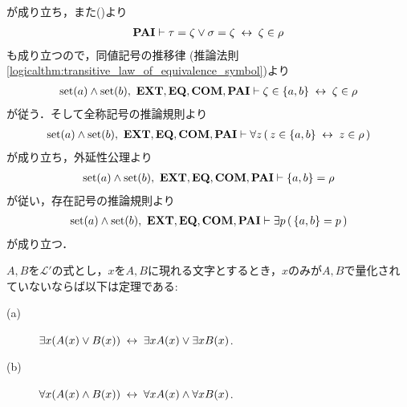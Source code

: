 \begin{sketch}
\begin{description}
				が成り立ち，また()より
				\begin{align}
					\mbox{{\bf PAI}} \vdash \tau = \zeta \vee \sigma = \zeta \hspace{0.25em}\leftrightarrow\hspace{0.25em} \zeta \in \rho
				\end{align}
				も成り立つので，同値記号の推移律
				(推論法則\ref{logicalthm:transitive_law_of_equivalence_symbol})より
				\begin{align}
					\operatorname*{set} (a) \wedge \operatorname*{set} (b),\ \mbox{{\bf EXT}},\mbox{{\bf EQ}},\mbox{\bf COM},\mbox{{\bf PAI}} \vdash 
					\zeta \in \{a,b\} \hspace{0.25em}\leftrightarrow\hspace{0.25em} \zeta \in \rho
				\end{align}
				が従う．そして全称記号の推論規則より
				\begin{align}
					\operatorname*{set} (a) \wedge \operatorname*{set} (b),\ \mbox{{\bf EXT}},\mbox{{\bf EQ}},\mbox{\bf COM},\mbox{{\bf PAI}} \vdash 
					\forall z\, (\, z \in \{a,b\} \hspace{0.25em}\leftrightarrow\hspace{0.25em} z \in \rho\, )
				\end{align}
				が成り立ち，外延性公理より
				\begin{align}
					\operatorname*{set} (a) \wedge \operatorname*{set} (b),\ \mbox{{\bf EXT}},\mbox{{\bf EQ}},\mbox{\bf COM},\mbox{{\bf PAI}} \vdash 
					\{a,b\} = \rho
				\end{align}
				が従い，存在記号の推論規則より
				\begin{align}
					\operatorname*{set} (a) \wedge \operatorname*{set} (b),\ \mbox{{\bf EXT}},\mbox{{\bf EQ}},\mbox{\bf COM},\mbox{{\bf PAI}} \vdash 
					\exists p\, (\, \{a,b\} = p\, )
				\end{align}
				が成り立つ．
				\QED
		\end{description}
	\end{sketch}
	
	\begin{screen}
		\begin{logicalthm}[量化記号の性質(ロ)]\label{logicalthm:properties_of_quantifiers_2}
			$A,B$を$\mathcal{L}'$の式とし，$x$を$A,B$に現れる文字とするとき，$x$のみが$A,B$で量化されていないならば以下は定理である:
			\begin{description}
				\item[(a)] $\exists x ( A(x) \vee B(x) ) \hspace{0.25em}\leftrightarrow\hspace{0.25em} \exists x A(x) \vee \exists x B(x)$.
				
				\item[(b)] $\forall x ( A(x) \wedge B(x) ) \hspace{0.25em}\leftrightarrow\hspace{0.25em} \forall x A(x) \wedge \forall x B(x)$.
			\end{description}
		\end{logicalthm}
	\end{screen}
	
